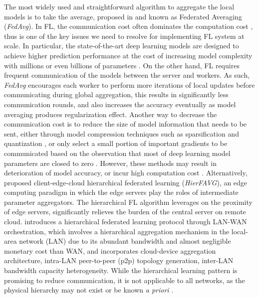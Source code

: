 \documentclass[10pt,twocolumn,letterpaper]{article}
\theoremstyle{definition}
\begin{document}
The most widely used and straightforward algorithm to aggregate the local models is to take the average, proposed in \cite{mcmahan2017communication} and known as Federated Averaging (\textit{FedAvg}).
In FL, the communication cost often dominates the computation cost \cite{mcmahan2017communication}, thus is one of the key issues we need to resolve for implementing FL system at scale. In particular, the state-of-the-art deep learning models are designed to achieve higher prediction performance at the cost of increasing model complexity with millions or even billions of parameters \cite{devlin2018bert, brown2020language}. On the other hand, FL requires frequent communication of the models between the server and workers. As such, \textit{FedAvg} \cite{mcmahan2017communication} encourages each worker to perform more iterations of local updates before communicating during global aggregation, this results in significantly less communication rounds, and also increases the accuracy eventually as model averaging produces regularization effect. Another way to decrease the communication cost is to reduce the size of model information that needs to be sent, either through model compression techniques such as sparsification \cite{stich2018sparsified} and quantization \cite{caldas2018expanding}, or only select a small portion of important gradients to be communicated \cite{tao2018esgd} based on the observation that most of deep learning model parameters are closed to zero \cite{strom2015scalable}.  However, these methods may result in deterioration of model accuracy, or incur high computation cost \cite{lim2020federated}. Alternatively, \cite{liu2020client} proposed client-edge-cloud hierarchical federated learning (\textit{HierFAVG}), an edge computing paradigm in which the edge servers play the roles of intermediate parameter aggregators. The hierarchical FL algorithm leverages on the proximity of edge servers, significantly relieves the burden of the central server on remote cloud. 
\cite{yuan2020hierarchical} introduces a hierarchical federated learning protocol through LAN-WAN orchestration, which involves a hierarchical aggregation mechanism in the local-area network (LAN) due to its abundant bandwidth and almost negligible monetary cost than WAN, and incorporates cloud-device aggregation architecture, intra-LAN peer-to-peer (p2p) topology generation, inter-LAN bandwidth capacity heterogeneity.
While the hierarchical learning pattern is promising to reduce communication, it is not applicable to all networks, as the physical hierarchy may not exist or be known \textit{a priori} \cite{li2020federated}. 
\end{document}
